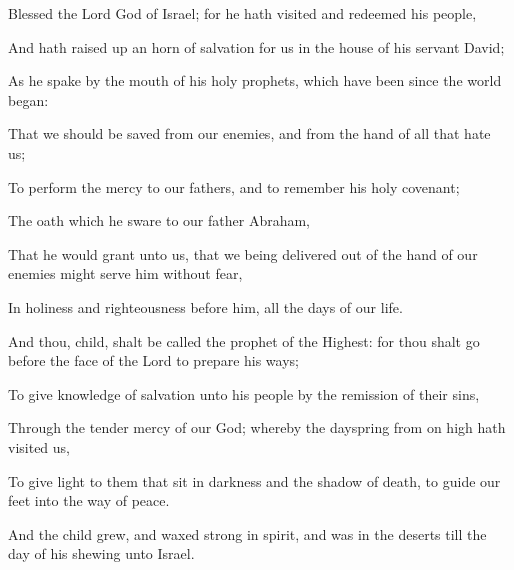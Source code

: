 {Blessed
{} the
Lord
God of Israel;
for he hath
visited
and
redeemed
his
people,

And hath raised
up an
horn of
salvation for
us
in the
house
of
his
servant
David;

As he
spake
by the
mouth
of
his
holy
prophets,
which have been
since the world
began:

That we should be
saved
from
our
enemies,
and
from the
hand of
all that
hate
us;

To
perform the
mercy
{}
to
our
fathers,
and to
remember
his
holy
covenant;

The
oath
which he
sware
to
our
father
Abraham,

That he would
grant unto
us, that we being
delivered out
of the
hand
of
our enemies might
serve
him without
fear,

In
holiness
and
righteousness
before
him,
all the
days
of
our
life.

And
thou,
child, shalt be
called the
prophet of the
Highest:
for thou shalt
go
before the
face of the
Lord to
prepare
his
ways;

To
give
knowledge of
salvation
unto
his
people
by the
remission
of
their
sins,

Through
the
tender
mercy
of
our
God;
whereby the
dayspring
from on
high hath
visited
us,

To give
light to
them that
sit
in
darkness
and
{} the
shadow of
death, to
guide
our
feet
into the
way of
peace.

And the
child
grew,
and waxed
strong in
spirit,
and
was
in the
deserts
till the
day
of
his
shewing
unto
Israel.




\par }

